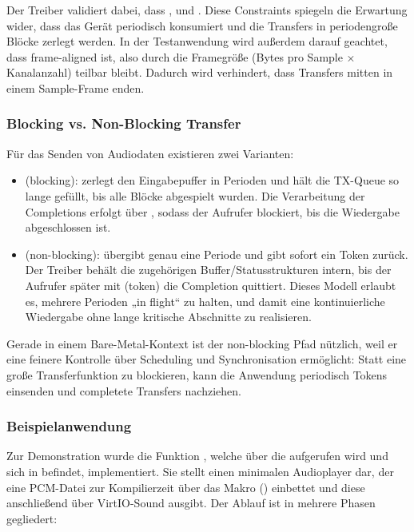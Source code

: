 Der Treiber validiert dabei, dass ,  und . Diese Constraints spiegeln die Erwartung wider, dass das Gerät periodisch konsumiert und die Transfers in periodengroße Blöcke zerlegt werden. In der Testanwendung wird außerdem darauf geachtet, dass  frame-aligned ist, also durch die Framegröße (Bytes pro Sample × Kanalanzahl) teilbar bleibt. Dadurch wird verhindert, dass Transfers mitten in einem Sample-Frame enden.

\subsubsection{Blocking vs. Non-Blocking Transfer}

Für das Senden von Audiodaten existieren zwei Varianten:

\begin{itemize}
 \item {}(blocking): zerlegt den Eingabepuffer in Perioden und hält die TX-Queue so lange gefüllt, bis alle Blöcke abgespielt wurden. Die Verarbeitung der Completions erfolgt über , sodass der Aufrufer blockiert, bis die Wiedergabe abgeschlossen ist.
 \item {}(non-blocking): übergibt genau eine Periode und gibt sofort ein Token zurück. Der Treiber behält die zugehörigen Buffer/Statusstrukturen intern, bis der Aufrufer später mit (token) die Completion quittiert. Dieses Modell erlaubt es, mehrere Perioden „in flight“ zu halten, und damit eine kontinuierliche Wiedergabe ohne lange kritische Abschnitte zu realisieren.
\end{itemize}

Gerade in einem Bare-Metal-Kontext ist der non-blocking Pfad nützlich, weil er eine feinere Kontrolle über Scheduling und Synchronisation ermöglicht: Statt eine große Transferfunktion zu blockieren, kann die Anwendung periodisch Tokens einsenden und completete Transfers nachziehen.

\subsubsection{Beispielanwendung}

Zur Demonstration wurde die Funktion , welche über die  aufgerufen wird und sich in  befindet, implementiert. Sie stellt einen minimalen Audioplayer dar, der eine PCM-Datei zur Kompilierzeit über das Makro () einbettet und diese anschließend über VirtIO-Sound ausgibt. Der Ablauf ist in mehrere Phasen gegliedert:

